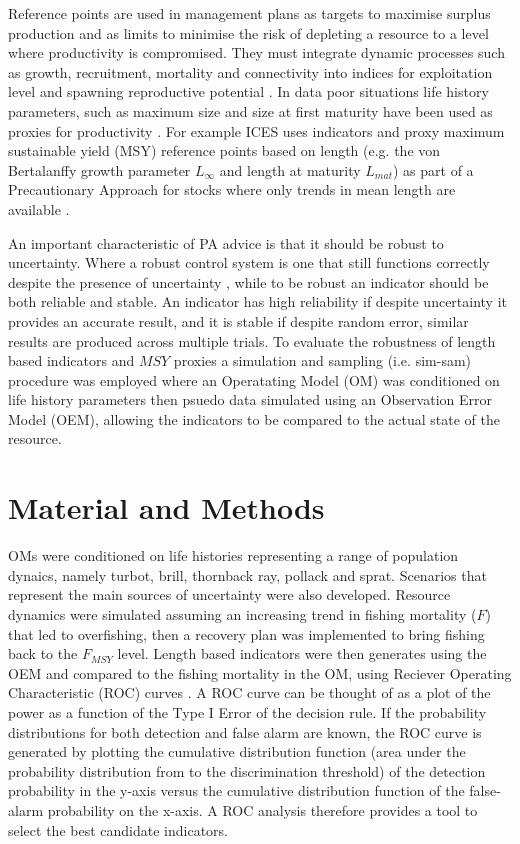 \documentclass[12pt,doublespacing,a4paper]{ouparticle}
\begin{document}
Reference points are used in management plans as targets to maximise surplus production and as limits to minimise the risk of depleting a resource to a level where productivity is compromised. They must integrate dynamic processes such as growth, recruitment, mortality and connectivity into indices for exploitation level and spawning reproductive potential \citep{kell2015spawning}. In data poor situations life history parameters, such as maximum size and size at first maturity have been used as proxies for productivity \citep{roff1984evolution,jensen1996beverton,caddy1998short,reynolds2001life,denney2002life}. For example ICES uses indicators and proxy maximum sustainable yield (MSY) reference points based on length (e.g. the von Bertalanffy growth parameter $L_{\infty}$ and length at maturity $L_{mat}$) as part of a Precautionary Approach for stocks where only trends in mean length are available \citep[][]{ref}. 

An important characteristic of PA advice is that it should be robust to uncertainty. Where a robust control system is one that still functions correctly despite the presence of uncertainty \citep{radatz1990ieee, zhou1996robust}, while to be robust an indicator should be both reliable and stable. An indicator has high reliability if despite uncertainty it provides an accurate result, and it is stable if despite random error, similar results are produced across multiple trials. To evaluate the robustness of length based indicators and $MSY$ proxies  a simulation and sampling (i.e. sim-sam) procedure was employed where an Operatating Model (OM) was conditioned on life history parameters then psuedo data simulated using an Observation Error Model (OEM), allowing the indicators to be compared to the actual state of the resource.


\section{Material and Methods}

OMs were conditioned on life histories representing a range of population dynaics, namely turbot, brill, thornback ray, pollack and sprat. Scenarios that represent the main sources of uncertainty were also developed. Resource dynamics were simulated assuming an increasing trend in fishing mortality ($F$) that led to overfishing, then a recovery plan was implemented to bring fishing back to the $F_{MSY}$ level. Length based indicators were then generates using the OEM and compared to the fishing mortality in the OM, using Reciever Operating Characteristic (ROC) curves \citep{green1966signal}. A ROC curve can be thought of as a plot of the power as a function of the Type I Error of the decision rule. If the probability distributions for both detection and false alarm are known, the ROC curve is generated by plotting the cumulative distribution function (area under the probability distribution from  to the discrimination threshold) of the detection probability in the y-axis versus the cumulative distribution function of the false-alarm probability on the x-axis. A ROC analysis therefore provides a tool to select the best candidate indicators. 
\end{document}
